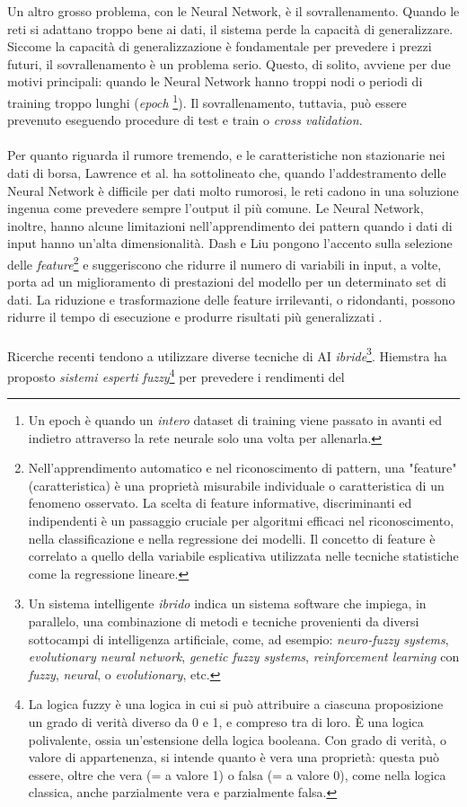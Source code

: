 \documentclass[a4paper,12pt]{report}
\begin{document}
Un altro grosso problema, con le Neural Network, è il sovrallenamento. Quando le reti si adattano troppo bene ai dati, il sistema perde la capacità di generalizzare. Siccome la capacità di generalizzazione è fondamentale per prevedere i prezzi futuri, il sovrallenamento è un problema serio. Questo, di solito, avviene per due motivi principali: quando le Neural Network hanno troppi nodi o periodi di training troppo lunghi (\textit{epoch} \footnote{Un epoch è quando un \textit{intero} dataset di training viene passato in avanti ed indietro attraverso la rete neurale solo una volta per allenarla.}). Il sovrallenamento, tuttavia, può essere prevenuto eseguendo procedure di test e train o \textit{cross validation}.\\~\\Per quanto riguarda il rumore tremendo, e le caratteristiche non stazionarie nei dati di borsa, Lawrence et al. \cite{nn1} ha sottolineato che, quando l'addestramento delle Neural Network è difficile per dati molto rumorosi, le reti cadono in una soluzione ingenua come prevedere sempre l'output il più comune. Le Neural Network, inoltre, hanno alcune limitazioni nell'apprendimento dei pattern quando i dati di input hanno un'alta dimensionalità. Dash e Liu \cite{2} pongono l'accento sulla selezione delle \textit{feature}\footnote{Nell'apprendimento automatico e nel riconoscimento di pattern, una "feature" (caratteristica) è una proprietà misurabile individuale o caratteristica di un fenomeno osservato. La scelta di feature informative, discriminanti ed indipendenti è un passaggio cruciale per algoritmi efficaci nel riconoscimento, nella classificazione e nella regressione dei modelli. Il concetto di feature è correlato a quello della variabile esplicativa utilizzata nelle tecniche statistiche come la regressione lineare.} e suggeriscono che ridurre il numero di variabili in input, a volte, porta ad un miglioramento di prestazioni del modello per un determinato set di dati. La riduzione e trasformazione delle feature irrilevanti, o ridondanti, possono ridurre il tempo di esecuzione e produrre risultati più generalizzati \cite{2}.\\~\\ Ricerche recenti tendono a utilizzare diverse tecniche di AI \textit{ibride}\footnote{Un sistema intelligente \textit{ibrido} indica un sistema software che impiega, in parallelo, una combinazione di metodi e tecniche provenienti da diversi sottocampi di intelligenza artificiale, come, ad esempio: \textit{neuro-fuzzy systems}, \textit{evolutionary neural network}, \textit{genetic fuzzy systems}, \textit{reinforcement learning} con \textit{fuzzy}, \textit{neural}, o \textit{evolutionary}, etc.}. Hiemstra \cite{11} ha proposto \textit{sistemi esperti fuzzy}\footnote{La logica fuzzy è una logica in cui si può attribuire a ciascuna proposizione un grado di verità diverso da 0 e 1, e compreso tra di loro. È una logica polivalente, ossia un'estensione della logica booleana. Con grado di verità, o valore di appartenenza, si intende quanto è vera una proprietà: questa può essere, oltre che vera (= a valore 1) o falsa (= a valore 0), come nella logica classica, anche parzialmente vera e parzialmente falsa.} per prevedere i rendimenti del 
\end{document}
